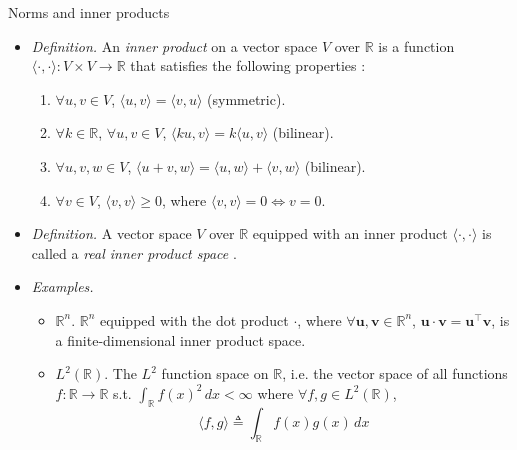 \documentclass{beamer}
\numberwithin{equation}{section}
\begin{document}
\begin{frame}{Norms and inner products}
    \begin{itemize}
        \item
        \textit{Definition.} An \textit{inner product} on a vector space $ V $
        over $ \mathbb{R} $ is a function $ \langle\cdot, \cdot\rangle :
        V \times V \rightarrow \mathbb{R} $ that satisfies the following
        properties \cite{jacob_linalg}:
        \begin{enumerate}
            \item
            $ \forall u, v \in V $, $ \langle u, v\rangle =
            \langle v, u\rangle $ (symmetric).

            \item
            $ \forall k \in \mathbb{R} $, $ \forall u, v \in V $,
            $ \langle ku, v\rangle = k\langle u, v\rangle $ (bilinear).

            \item
            $ \forall u, v, w \in V $, $ \langle u + v, w\rangle =
            \langle u, w\rangle + \langle v, w\rangle $ (bilinear).

            \item
            $ \forall v \in V $, $ \langle v, v\rangle \ge 0 $, where
            $ \langle v, v\rangle = 0 \Leftrightarrow v = 0 $.
        \end{enumerate}

        \item
        \textit{Definition.} A vector space $ V $ over $ \mathbb{R} $ equipped
        with an inner product $ \langle\cdot, \cdot\rangle $ is called a
        \textit{real inner product space} \cite{jacob_linalg}.

        \item
        \textit{Examples.}
        \begin{itemize}
            \item
            $ \mathbb{R}^n $. $ \mathbb{R}^n $ equipped with the dot product
            $ \cdot $, where $ \forall \mathbf{u}, \mathbf{v} \in
            \mathbb{R}^n $, $ \mathbf{u}\cdot\mathbf{v} =
            \mathbf{u}^\top\mathbf{v} $, is a finite-dimensional inner product
            space.

            \item
            $ L^2(\mathbb{R}) $. The $ L^2 $ function space on $ \mathbb{R} $,
            i.e. the vector space of all functions $ f : \mathbb{R}
            \rightarrow \mathbb{R} $ s.t.
            $ \int_\mathbb{R}f(x)^2\,dx < \infty $ where $ \forall f, g
            \in L^2(\mathbb{R}) $,
            \begin{equation*}
                \langle f, g\rangle \triangleq \int_\mathbb{R}f(x)g(x)\,dx
            \end{equation*}
        \end{itemize}
    \end{itemize}
\end{frame}
\end{document}
